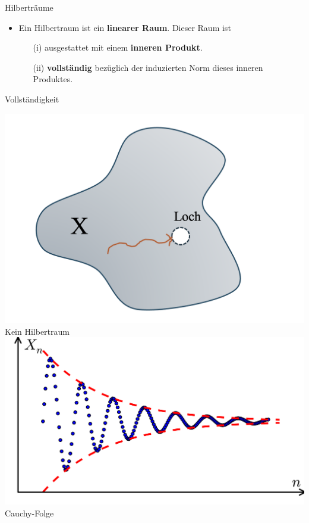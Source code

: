 \documentclass[14pt, aspectratio=169, handout]{beamer}
\begin{document}
\begin{frame}{Hilberträume}
    \begin{itemize}
        \item Ein Hilbertraum ist ein \textbf{linearer Raum}. Dieser Raum ist
        \begin{itemize}
            \item[] 
            \item[(i)] ausgestattet mit einem \textbf{inneren Produkt}.
            \item[] 
            \item[(ii)] \textbf{vollständig} bezüglich der induzierten Norm dieses inneren Produktes.
        \end{itemize}
    \end{itemize}
\end{frame}

\begin{frame}{Vollständigkeit}
    \begin{center}
    \begin{multicols}{2}
        \includegraphics[width=0.7\linewidth]{figures/Kein_Hilbertraum.png}\\
        Kein Hilbertraum
        \includegraphics[width=0.9\linewidth]{figures/Cauchy_Folge.png}\\
        Cauchy-Folge
    \end{multicols}
    \end{center}
\end{frame}
\end{document}
